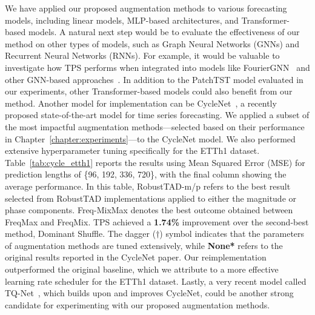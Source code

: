 We have applied our proposed augmentation methods to various forecasting models, including linear models, MLP-based architectures, and Transformer-based models. A natural next step would be to evaluate the effectiveness of our method on other types of models, such as Graph Neural Networks (GNNs) and Recurrent Neural Networks (RNNs). For example, it would be valuable to investigate how TPS performs when integrated into models like FourierGNN~\cite{yi2023fouriergnnrethinkingmultivariatetime} and other GNN-based approaches~\cite{NEURIPS2020_ce1aad92, cao2021spectraltemporalgraphneural}.
In addition to the PatchTST model evaluated in our experiments, other Transformer-based models could also benefit from our method. Another model for implementation can be CycleNet~\cite{lin2024cyclenetenhancingtimeseries}, a recently proposed state-of-the-art model for time series forecasting.  We applied a subset of the most impactful augmentation methods—selected based on their performance in Chapter~\ref{chapter:experiments}—to the CycleNet model. We also performed extensive hyperparameter tuning specifically for the ETTh1 dataset.
Table~\ref{tab:cycle_etth1} reports the results using Mean Squared Error (MSE) for prediction lengths of \{96, 192, 336, 720\}, with the final column showing the average performance. In this
table, RobustTAD-m/p refers to the best result selected from RobustTAD
implementations applied to either the magnitude or phase components. Freq-MixMax denotes the best outcome obtained between FreqMax and FreqMix. TPS achieved a \textbf{1.74\%} improvement over the second-best method, Dominant Shuffle. The dagger ($\dagger$) symbol indicates that the parameters of augmentation methods are tuned extensively, while \textbf{None*} refers to the original results reported in the CycleNet paper. Our reimplementation outperformed the original baseline, which we attribute to a more effective learning rate scheduler for the ETTh1 dataset.
Lastly, a very recent model called TQ-Net~\cite{lin2025temporalquerynetworkefficient}, which builds upon and improves CycleNet, could be another strong candidate for experimenting with our proposed augmentation methods.




